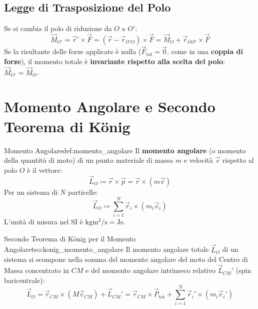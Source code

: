 \subsection{Legge di Trasposizione del Polo}
Se si cambia il polo di riduzione da $O$ a $O'$:
\begin{equation}
    \vec{M}_{O'} = \vec{r}' \times \vec{F} = (\vec{r} - \vec{r}_{O'O}) \times \vec{F} = \vec{M}_O + \vec{r}_{OO'} \times \vec{F}
    \label{eq:trasposizione_polo}
\end{equation}
Se la risultante delle forze applicate è nulla ($\vec{F}_{\text{tot}} = \vec{0}$, come in una \textbf{coppia di forze}), il momento totale è \textbf{invariante rispetto alla scelta del polo}: $\vec{M}_{O'} = \vec{M}_O$.

\section{Momento Angolare e Secondo Teorema di König}
\label{sec:momento_angolare}

\begin{definizione}{Momento Angolare}{def:momento_angolare}
Il \textbf{momento angolare} (o momento della quantità di moto) di un punto materiale di massa $m$ e velocità $\vec{v}$ rispetto al polo $O$ è il vettore:
\begin{equation}
    \vec{L}_O \coloneqq \vec{r} \times \vec{p} = \vec{r} \times (m\vec{v})
    \label{eq:momento_angolare_punto}
\end{equation}
Per un sistema di $N$ particelle:
\begin{equation}
    \vec{L}_O \coloneqq \sum_{i=1}^N \vec{r}_i \times (m_i\vec{v}_i)
    \label{eq:momento_angolare_sistema}
\end{equation}
L'unità di misura nel SI è $\si{\kilogram\metre\squared\per\second} = \si{\joule\second}$.
\end{definizione}

\begin{teorema}{Secondo Teorema di König per il Momento Angolare}{teo:konig_momento_angolare}
Il momento angolare totale $\vec{L}_O$ di un sistema si scompone nella somma del momento angolare del moto del Centro di Massa concentrato in $CM$ e del momento angolare intrinseco relativo $\vec{L}_{CM}'$ (spin baricentrale):
\begin{equation}
    \vec{L}_O = \vec{r}_{CM} \times (M\vec{v}_{CM}) + \vec{L}_{CM}' = \vec{r}_{CM} \times \vec{P}_{\text{tot}} + \sum_{i=1}^N \vec{r}_i' \times (m_i\vec{v}_i')
    \label{eq:konig_L}
\end{equation}
\end{teorema}

